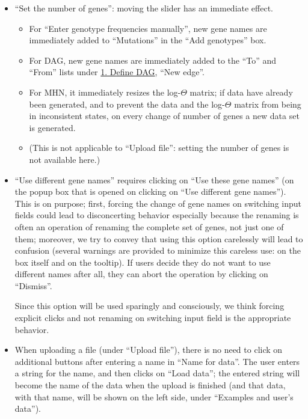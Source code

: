 \documentclass[a4paper,11pt]{article}
\begin{document}
\begin{itemize}
\item ``Set the number of genes'': moving the slider has an immediate effect. 
  \begin{itemize}
  \item For ``Enter genotype frequencies manually'', new gene names are immediately added to ``Mutations'' in the ``Add genotypes'' box.
  \item For DAG, new gene names are immediately added to the ``To'' and ``From'' lists under \underline{1. Define DAG}, ``New edge''.
    
  \item For MHN, it immediately resizes the log-$\Theta$ matrix; if data have already been generated, and to prevent the data and the log-$\Theta$ matrix from being in inconsistent states, on every change of number of genes a new data set is generated.
  \item (This is not applicable to ``Upload file'':  setting the number of genes is not available here.)
  \end{itemize}



\item ``Use different gene names'' requires clicking on ``Use these gene names'' (on the popup box that is opened on clicking on ``Use different gene names''). This is on purpose; first, forcing the change of gene names on switching input fields could lead to disconcerting behavior especially because the renaming is often an operation of renaming the complete set of genes, not just one of them; moreover,  we try to convey that using this option carelessly will lead to confusion (several warnings are provided to minimize this careless use: on the box itself and on the tooltip). If users decide they do not want to use different names after all, they can abort the operation by clicking on ``Dismiss''.

  Since this option will be used sparingly and consciously, we think forcing explicit clicks and not renaming on switching input field is the appropriate behavior.

  
\item When uploading a file (under ``Upload file''), there is no need to click on additional buttons after entering a name in ``Name for data''. The user enters a string for the name, and then clicks on ``Load data''; the entered string will become the name of the data when the upload is finished (and that data, with that name, will be shown on the left side, under ``Examples and user's data'').


\end{itemize}
\end{document}
